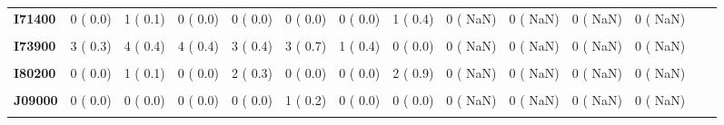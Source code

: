 \documentclass[
]{article}
\begin{document}
\begin{table}[H]
\begin{tabular}[t]{>{\raggedright\arraybackslash}p{5em}ccccccccccccc}
\textbf{I71400} & 0 (  0.0) & 1 (  0.1) & 0 (  0.0) & 0 (  0.0) & 0 (  0.0) & 0 (  0.0) & 1 (  0.4) & 0 (  NaN) & 0 (  NaN) & 0 (  NaN) & 0 (  NaN) &  & \\
\textbf{\cellcolor{gray!10}{I71800}} & \cellcolor{gray!10}{1 (  0.1)} & \cellcolor{gray!10}{0 (  0.0)} & \cellcolor{gray!10}{0 (  0.0)} & \cellcolor{gray!10}{1 (  0.1)} & \cellcolor{gray!10}{0 (  0.0)} & \cellcolor{gray!10}{0 (  0.0)} & \cellcolor{gray!10}{0 (  0.0)} & \cellcolor{gray!10}{0 (  NaN)} & \cellcolor{gray!10}{0 (  NaN)} & \cellcolor{gray!10}{0 (  NaN)} & \cellcolor{gray!10}{0 (  NaN)} & \cellcolor{gray!10}{} & \cellcolor{gray!10}{}\\
\textbf{I73900} & 3 (  0.3) & 4 (  0.4) & 4 (  0.4) & 3 (  0.4) & 3 (  0.7) & 1 (  0.4) & 0 (  0.0) & 0 (  NaN) & 0 (  NaN) & 0 (  NaN) & 0 (  NaN) &  & \\
\textbf{\cellcolor{gray!10}{I77000}} & \cellcolor{gray!10}{0 (  0.0)} & \cellcolor{gray!10}{0 (  0.0)} & \cellcolor{gray!10}{0 (  0.0)} & \cellcolor{gray!10}{0 (  0.0)} & \cellcolor{gray!10}{1 (  0.2)} & \cellcolor{gray!10}{0 (  0.0)} & \cellcolor{gray!10}{0 (  0.0)} & \cellcolor{gray!10}{0 (  NaN)} & \cellcolor{gray!10}{0 (  NaN)} & \cellcolor{gray!10}{0 (  NaN)} & \cellcolor{gray!10}{0 (  NaN)} & \cellcolor{gray!10}{} & \cellcolor{gray!10}{}\\
\textbf{I80200} & 0 (  0.0) & 1 (  0.1) & 0 (  0.0) & 2 (  0.3) & 0 (  0.0) & 0 (  0.0) & 2 (  0.9) & 0 (  NaN) & 0 (  NaN) & 0 (  NaN) & 0 (  NaN) &  & \\
\textbf{\cellcolor{gray!10}{I85000}} & \cellcolor{gray!10}{0 (  0.0)} & \cellcolor{gray!10}{0 (  0.0)} & \cellcolor{gray!10}{0 (  0.0)} & \cellcolor{gray!10}{0 (  0.0)} & \cellcolor{gray!10}{0 (  0.0)} & \cellcolor{gray!10}{1 (  0.4)} & \cellcolor{gray!10}{0 (  0.0)} & \cellcolor{gray!10}{0 (  NaN)} & \cellcolor{gray!10}{0 (  NaN)} & \cellcolor{gray!10}{0 (  NaN)} & \cellcolor{gray!10}{0 (  NaN)} & \cellcolor{gray!10}{} & \cellcolor{gray!10}{}\\
\textbf{J09000} & 0 (  0.0) & 0 (  0.0) & 0 (  0.0) & 0 (  0.0) & 1 (  0.2) & 0 (  0.0) & 0 (  0.0) & 0 (  NaN) & 0 (  NaN) & 0 (  NaN) & 0 (  NaN) &  & \\
\textbf{\cellcolor{gray!10}{J15900}} & \cellcolor{gray!10}{0 (  0.0)} & \cellcolor{gray!10}{0 (  0.0)} & \cellcolor{gray!10}{1 (  0.1)} & \cellcolor{gray!10}{0 (  0.0)} & \cellcolor{gray!10}{1 (  0.2)} & \cellcolor{gray!10}{0 (  0.0)} & \cellcolor{gray!10}{0 (  0.0)} & \cellcolor{gray!10}{0 (  NaN)} & \cellcolor{gray!10}{0 (  NaN)} & \cellcolor{gray!10}{0 (  NaN)} & \cellcolor{gray!10}{0 (  NaN)} & \cellcolor{gray!10}{} & \cellcolor{gray!10}{}\\

\end{tabular}
\end{table}
\end{document}
